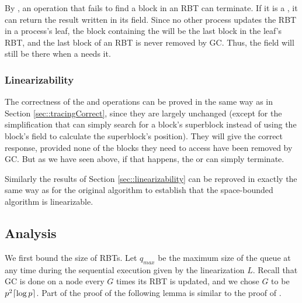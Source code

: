 By , an operation that fails to find a block in an RBT can terminate.
If it is a , it can return the result written in its  field.
Since no other process updates the RBT in a process's leaf, the block containing the 
will be the last block in the leaf's RBT, and the last block of an RBT is never removed by GC.
Thus, the  field will still be there when a  needs it.

\subsubsection{Linearizability}

The correctness of the  and   operations
can be proved in the same way as in Section \ref{sec::tracingCorrect},
since they are largely unchanged (except for the simplification that 
can simply search for a block's superblock instead of using the block's  
field to calculate the superblock's position).
They will give the correct response, provided none of the blocks they need to access have been 
removed by GC.  But as we have seen above, if that happens, the  or  can simply terminate.

Similarly the results of Section \ref{sec::linearizability} 
can be reproved in exactly the same way as for the original algorithm to establish
that the space-bounded algorithm is linearizable.

\subsection{Analysis}
\label{sec::GCanalysis}


We first bound the size of RBTs.  Let $q_{max}$ be the maximum size of the queue at any time during the sequential execution given by the linearization $L$.
Recall that GC is done on a node every $G$ times its RBT is updated, and we chose $G$ to be $p^2\lceil \log p \rceil$.
Part of the proof of the following lemma is similar to the proof of .

